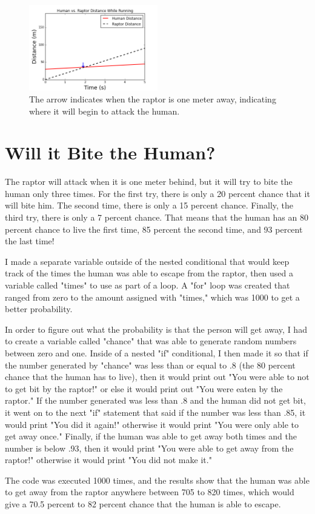 \documentclass[twocolumn]{revtex4}
\begin{document}
\begin{figure}[h!!!]
	\centering
	\includegraphics[width=0.5\textwidth]{HVR_new.png}
	\caption{The arrow indicates when the raptor is one meter away, indicating where it will begin to attack the human. \label{fig:HVR_new}}
\end{figure}

\section{Will it Bite the Human?}
The raptor will attack when it is one meter behind, but it will try to bite the human only three times. For the first try, there is only a 20 percent chance that it will bite him. The second time, there is only a 15 percent chance. Finally, the third try, there is only a 7 percent chance. That means that the human has an 80 percent chance to live the first time, 85 percent the second time, and 93 percent the last time!

I made a separate variable outside of the nested conditional that would keep track of the times the human was able to escape from the raptor, then used a variable called "times" to use as part of a loop. A "for" loop was created that ranged from zero to the amount assigned with "times," which was 1000 to get a better probability.

In order to figure out what the probability is that the person will get away, I had to create a variable called "chance" that was able to generate random numbers between zero and one. Inside of a nested "if" conditional, I then made it so that if the number generated by "chance" was less than or equal to .8 (the 80 percent chance that the human has to live), then it would print out "You were able to not to get bit by the raptor!" or else it would print out "You were eaten by the raptor." If the number generated was less than .8 and the human did not get bit, it went on to the next "if" statement that said if the number was less than .85, it would print "You did it again!" otherwise it would print "You were only able to get away once." Finally, if the human was able to get away both times and the number is below .93, then it would print "You were able to get away from the raptor!" otherwise it would print "You did not make it."

The code was executed 1000 times, and the results show that the human was able to get away from the raptor anywhere between 705 to 820 times, which would give a 70.5 percent to 82 percent chance that the human is able to escape.

\end{document}
